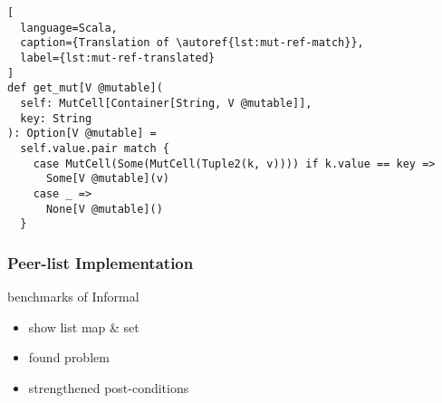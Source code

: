 \begin{lstlisting}[
  language=Scala,
  caption={Translation of \autoref{lst:mut-ref-match}},
  label={lst:mut-ref-translated}
]
def get_mut[V @mutable](
  self: MutCell[Container[String, V @mutable]],
  key: String
): Option[V @mutable] =
  self.value.pair match {
    case MutCell(Some(MutCell(Tuple2(k, v)))) if k.value == key =>
      Some[V @mutable](v)
    case _ =>
      None[V @mutable]()
  }
\end{lstlisting}

\subsubsection{Peer-list Implementation}

benchmarks of Informal

\begin{itemize}
  \item show list map \& set
  \item found problem
  \item strengthened post-conditions
\end{itemize}
